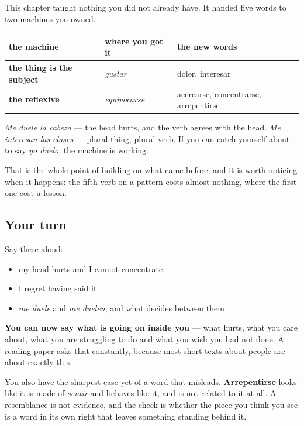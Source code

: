 \begin{grammarlens}[title={Grammar Lens: five new words, no new grammar}]
This chapter taught nothing you did not already have. It handed five words to two machines you owned.

\noindent
\begin{tabularx}{\linewidth}{@{}>{\raggedright\arraybackslash}X>{\raggedright\arraybackslash}X>{\raggedright\arraybackslash}X@{}}
\toprule
\textbf{the machine} & \textbf{where you got it} & \textbf{the new words} \\
\midrule
\textbf{the thing is the subject} & \emph{gustar} & doler, interesar \\
\textbf{the reflexive} & \emph{equivocarse} & acercarse, concentrarse, arrepentirse \\
\bottomrule
\end{tabularx}

\emph{Me duele la cabeza} — the head hurts, and the verb agrees with the head. \emph{Me interesan las clases} — plural thing, plural verb. If you can catch yourself about to say \emph{yo duelo}, the machine is working.

That is the whole point of building on what came before, and it is worth noticing when it happens: the fifth verb on a pattern costs almost nothing, where the first one cost a lesson.
\end{grammarlens}

\subsection*{Your turn}
Say these aloud:

\begin{itemize}
\raggedright
  \item my head hurts and I cannot concentrate
  \item I regret having said it
  \item \emph{me duele} and \emph{me duelen}, and what decides between them
\end{itemize}

\begin{grammarlens}[title={What you've built}]
\textbf{You can now say what is going on inside you} — what hurts, what you care about, what you are struggling to do and what you wish you had not done. A reading paper asks that constantly, because most short texts about people are about exactly this.

You also have the sharpest case yet of a word that misleads. \textbf{Arrepentirse} looks like it is made of \emph{sentir} and behaves like it, and is not related to it at all. A resemblance is not evidence, and the check is whether the piece you think you see is a word in its own right that leaves something standing behind it.
\end{grammarlens}

